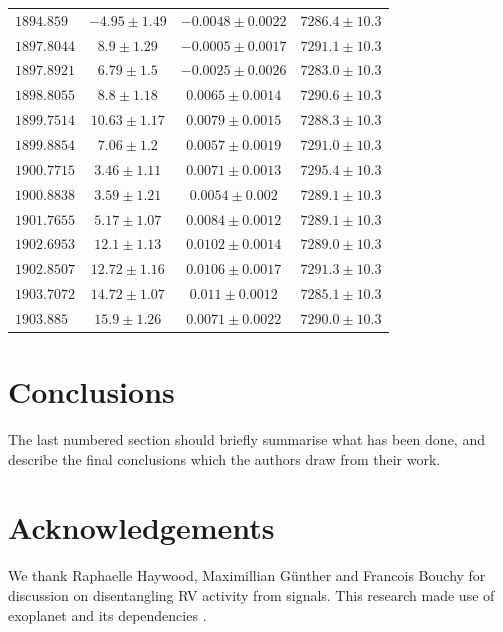 \documentclass[fleqn,usenatbib]{mnras}
\begin{document}
\begin{table}
\begin{tabular}{lccc}
$1894.859$ & $-4.95\pm1.49$ & $-0.0048\pm0.0022$ & $7286.4\pm10.3$ \\
$1897.8044$ & $8.9\pm1.29$ & $-0.0005\pm0.0017$ & $7291.1\pm10.3$ \\
$1897.8921$ & $6.79\pm1.5$ & $-0.0025\pm0.0026$ & $7283.0\pm10.3$ \\
$1898.8055$ & $8.8\pm1.18$ & $0.0065\pm0.0014$ & $7290.6\pm10.3$ \\
$1899.7514$ & $10.63\pm1.17$ & $0.0079\pm0.0015$ & $7288.3\pm10.3$ \\
$1899.8854$ & $7.06\pm1.2$ & $0.0057\pm0.0019$ & $7291.0\pm10.3$ \\
$1900.7715$ & $3.46\pm1.11$ & $0.0071\pm0.0013$ & $7295.4\pm10.3$ \\
$1900.8838$ & $3.59\pm1.21$ & $0.0054\pm0.002$ & $7289.1\pm10.3$ \\
$1901.7655$ & $5.17\pm1.07$ & $0.0084\pm0.0012$ & $7289.1\pm10.3$ \\
$1902.6953$ & $12.1\pm1.13$ & $0.0102\pm0.0014$ & $7289.0\pm10.3$ \\
$1902.8507$ & $12.72\pm1.16$ & $0.0106\pm0.0017$ & $7291.3\pm10.3$ \\
$1903.7072$ & $14.72\pm1.07$ & $0.011\pm0.0012$ & $7285.1\pm10.3$ \\
$1903.885$ & $15.9\pm1.26$ & $0.0071\pm0.0022$ & $7290.0\pm10.3$ \\
\hline
\hline
\end{tabular}
\end{table}

\section{Conclusions}

The last numbered section should briefly summarise what has been done, and describe
the final conclusions which the authors draw from their work.

\section*{Acknowledgements}
We thank Raphaelle Haywood, Maximillian G{\"u}nther and Francois Bouchy for discussion on disentangling RV activity from signals.
This research made use of \textsf{exoplanet} \citep{exoplanet} and its
dependencies \citep{exoplanet:agol19, exoplanet:astropy13, exoplanet:astropy18,
exoplanet:exoplanet, exoplanet:foremanmackey17, exoplanet:foremanmackey18,
exoplanet:luger18, exoplanet:pymc3, exoplanet:theano}.
\end{document}
